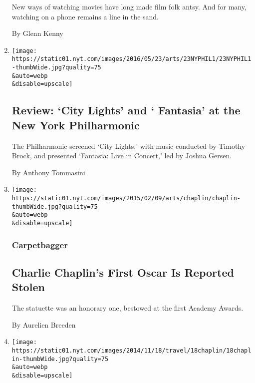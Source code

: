 \begin{enumerate}
  New ways of watching movies have long made film folk antsy. And for
  many, watching on a phone remains a line in the sand.

  By Glenn Kenny
\item
  \href{/2016/05/23/arts/music/review-city-lights-and-fantasia-at-the-new-york-philharmonic.html}{}

  \texttt{[image: https://static01.nyt.com/images/2016/05/23/arts/23NYPHIL1/23NYPHIL1-thumbWide.jpg?quality=75\\\&auto=webp\\\&disable=upscale]}

  \hypertarget{review-city-lights-and--fantasia-at-the-new-york-philharmonic}{%
  \subsection{Review: `City Lights' and ` Fantasia' at the New York
  Philharmonic}\label{review-city-lights-and--fantasia-at-the-new-york-philharmonic}}

  The Philharmonic screened `City Lights,' with music conducted by
  Timothy Brock, and presented `Fantasia: Live in Concert,' led by
  Joshua Gersen.

  By Anthony Tommasini
\item
  \href{https://carpetbagger.blogs.nytimes.com/2015/02/09/charlie-chaplins-first-oscar-is-reported-stolen/}{}

  \texttt{[image: https://static01.nyt.com/images/2015/02/09/arts/chaplin/chaplin-thumbWide.jpg?quality=75\\\&auto=webp\\\&disable=upscale]}

  \hypertarget{carpetbagger}{%
  \subsubsection{Carpetbagger}\label{carpetbagger}}

  \hypertarget{charlie-chaplins-first-oscar-is-reported-stolen}{%
  \subsection{Charlie Chaplin's First Oscar Is Reported
  Stolen}\label{charlie-chaplins-first-oscar-is-reported-stolen}}

  The statuette was an honorary one, bestowed at the first Academy
  Awards.

  By Aurelien Breeden
\item
  \href{https://intransit.blogs.nytimes.com/2014/11/18/in-switzerland-charlie-chaplin-in-focus/}{}

  \texttt{[image: https://static01.nyt.com/images/2014/11/18/travel/18chaplin/18chaplin-thumbWide.jpg?quality=75\\\&auto=webp\\\&disable=upscale]}


\end{enumerate}
